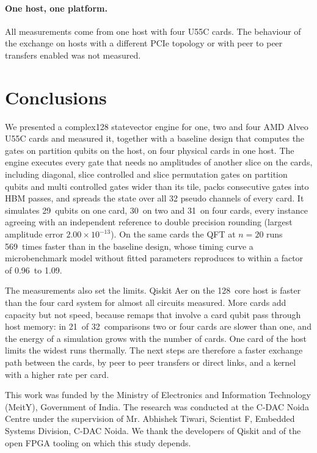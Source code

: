 \documentclass[pdflatex,sn-mathphys-num]{sn-jnl}
\newcommand{\NumHostCores}{128}
\newcommand{\NumMaxWidthFourCards}{31}
\newcommand{\NumMaxWidthOneCard}{29}
\newcommand{\NumMaxWidthTwoCards}{30}
\newcommand{\NumModelRatioMax}{1.09}
\newcommand{\NumModelRatioMin}{0.96}
\newcommand{\NumScaleBelowOne}{21}
\newcommand{\NumScaleCases}{32}
\newcommand{\NumSubmittedOverRevisedQftTwenty}{569}
\newcommand{\NumWorstMaxAbsErr}{$2.00\times 10^{-13}$}
\theoremstyle{thmstyleone}
\theoremstyle{thmstylethree}
\begin{document}
\paragraph{One host, one platform.} All measurements come from one host with four U55C cards. The behaviour of the
exchange on hosts with a different PCIe topology or with peer to peer transfers enabled was not measured.
\section{Conclusions}\label{sec:conclusions}

We presented a complex128 statevector engine for one, two and four AMD Alveo U55C cards and measured it, together with
a baseline design that computes the gates on partition qubits on the host, on four physical cards in one host. The engine executes every gate that needs no
amplitudes of another slice on the cards, including diagonal, slice controlled and slice permutation gates on partition
qubits and multi controlled gates wider than its tile, packs consecutive gates into HBM passes, and spreads the
state over all 32 pseudo channels of every card. It simulates \NumMaxWidthOneCard~qubits on one card, \NumMaxWidthTwoCards~on two and \NumMaxWidthFourCards~on four cards,
every instance agreeing with an independent reference to double precision rounding (largest amplitude error
\NumWorstMaxAbsErr). On the same cards the QFT at $n=20$ runs \NumSubmittedOverRevisedQftTwenty~times faster than in the
baseline design, whose timing curve a microbenchmark model without fitted parameters reproduces to within a factor
of \NumModelRatioMin~to \NumModelRatioMax.

The measurements also set the limits. Qiskit Aer on the \NumHostCores~core host is faster than the four card system for
almost all circuits measured. More cards add capacity but not speed, because remaps that involve a card qubit pass
through host memory: in \NumScaleBelowOne~of \NumScaleCases~comparisons two or four cards are slower than one, and the
energy of a simulation grows with the number of cards. One card of the host limits the widest runs thermally. The next
steps are therefore a faster exchange path between the cards, by peer to peer transfers or direct links, and a kernel
with a higher rate per card.

\backmatter

This work was funded by the Ministry of Electronics and Information Technology (MeitY), Government of India. The
research was conducted at the C-DAC Noida Centre under the supervision of Mr. Abhishek Tiwari, Scientist F, Embedded
Systems Division, C-DAC Noida. We thank the developers of Qiskit and of the open FPGA tooling on which this study
depends.
\end{document}
